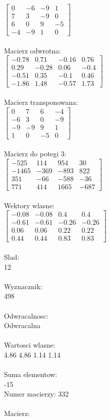 \documentclass[a4paper,12pt]{article}
\begin{document}
$\begin{bmatrix} 0&-6&-9&1\\7&3&-9&0\\6&0&9&-5\\-4&-9&1&0 \end{bmatrix}$
\\
\\
Macierz odwrotna:\\

$\begin{bmatrix} -0.78&0.71&-0.16&0.76\\0.29&-0.28&0.06&-0.4\\-0.51&0.35&-0.1&0.46\\-1.86&1.48&-0.57&1.73 \end{bmatrix}$
\\
\\
Macierz transponowana:\\

$\begin{bmatrix} 0&7&6&-4\\-6&3&0&-9\\-9&-9&9&1\\1&0&-5&0 \end{bmatrix}$
\\
\\
Macierz do potegi 3:\\

$\begin{bmatrix} -525&114&954&30\\-1465&-369&-893&822\\351&-66&-588&-36\\771&414&1665&-687 \end{bmatrix}$
\\
\\
Wektory wlasne:\\

$\begin{bmatrix} -0.08&-0.08&0.4&0.4\\-0.61&-0.61&-0.26&-0.26\\0.06&0.06&0.22&0.22\\0.44&0.44&0.83&0.83 \end{bmatrix}$
\\
\\
Slad:\\
12
\\
\\
Wyznacznik:\\
498
\\
\\
Odwracalnosc:\\
Odwracalna
\\
\\
Wartosci wlasne:\\
4.86 4.86 1.14 1.14
\\
\\
Suma elementow:\\
-15
\\
\newpage
Numer macierzy:
332
\\
\\
Macierz:\\
\end{document}
